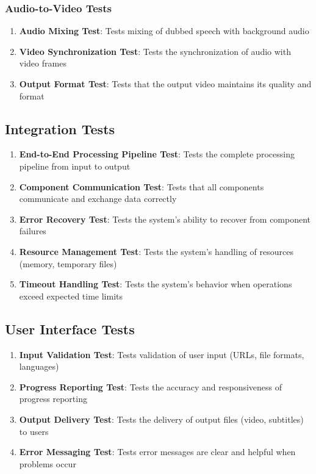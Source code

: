 \documentclass[11pt,a4paper]{article}
\begin{document}
\subsubsection{Audio-to-Video Tests}
\begin{enumerate}[label=AV\arabic*]
    \item \textbf{Audio Mixing Test}: Tests mixing of dubbed speech with background audio
    \item \textbf{Video Synchronization Test}: Tests the synchronization of audio with video frames
    \item \textbf{Output Format Test}: Tests that the output video maintains its quality and format
\end{enumerate}

\subsection{Integration Tests}

\begin{enumerate}[label=IT\arabic*]
    \item \textbf{End-to-End Processing Pipeline Test}: Tests the complete processing pipeline from input to output
    \item \textbf{Component Communication Test}: Tests that all components communicate and exchange data correctly
    \item \textbf{Error Recovery Test}: Tests the system's ability to recover from component failures
    \item \textbf{Resource Management Test}: Tests the system's handling of resources (memory, temporary files)
    \item \textbf{Timeout Handling Test}: Tests the system's behavior when operations exceed expected time limits
\end{enumerate}

\subsection{User Interface Tests}

\begin{enumerate}[label=UI\arabic*]
    \item \textbf{Input Validation Test}: Tests validation of user input (URLs, file formats, languages)
    \item \textbf{Progress Reporting Test}: Tests the accuracy and responsiveness of progress reporting
    \item \textbf{Output Delivery Test}: Tests the delivery of output files (video, subtitles) to users
    \item \textbf{Error Messaging Test}: Tests error messages are clear and helpful when problems occur
\end{enumerate}
\end{document}
